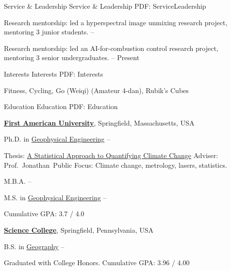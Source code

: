 \documentclass[letterpaper,MMMyyyy,nonstopmode]{simpleresumecv}
\begin{document}
\begin{Body}
\Section
{Service \& Leadership}
{Service \& Leadership}
{PDF: ServiceLeadership}

\BulletItem
Research mentorship: led a hyperspectral image unmixing research project, \\ mentoring 3 junior students.
\hfill
{} --

\Gap
\BulletItem
Research mentorship: led an AI-for-combustion control research project, \\ mentoring 3 senior undergraduates.
\hfill
{} --
Present

\Section
{Interests}
{Interests}
{PDF: Interests}

\Entry
Fitness, Cycling, Go (Weiqi) (Amateur 4-dan), Rubik's Cubes

\iffalse

\Section
{Education}
{Education}
{PDF: Education}

\Entry
\href{http://www.example.com/my-university}
{\textbf{First American University}},
Springfield, Massachusetts, USA

\Gap
\BulletItem
Ph.D. in
\href{http://www.example.com/my-department}
{Geophysical Engineering}
\hfill
{} --
\begin{Detail}
\SubBulletItem
Thesis:
\href{http://www.example.com/my-phd-thesis}
{A Statistical Approach to Quantifying Climate Change}
\SubBulletItem
Adviser:
Prof.~Jonathan~Public
\SubBulletItem
Focus:
Climate change, metrology, lasers, statistics.
\end{Detail}

\Gap
\BulletItem
M.B.A.
\hfill
{} --

\Gap
\BulletItem
M.S. in
\href{http://www.example.com/my-department}
{Geophysical Engineering}
\hfill
{} --
\begin{Detail}
\SubBulletItem
Cumulative GPA: 3.7 / 4.0
\end{Detail}

\BigGap
\Entry
\href{http://www.example.com/my-college}
{\textbf{Science College}},
Springfield, Pennsylvania, USA

\Gap
\BulletItem
B.S. in
\href{http://www.example.com/my-department}
{Geography}
\hfill
{} --
\begin{Detail}
\SubBulletItem
Graduated with College Honors.
\SubBulletItem
Cumulative GPA: 3.96 / 4.00
\end{Detail}


\end{Body}
\end{document}
